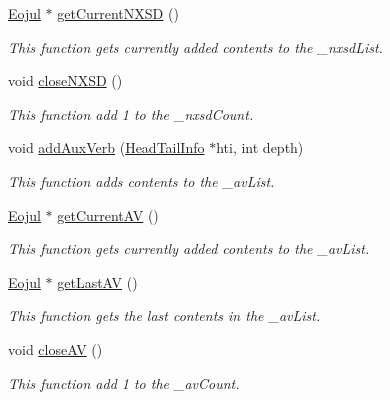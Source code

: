 \begin{CompactItemize}
\hyperlink{classkmaOrange_1_1Eojul}{Eojul} $\ast$ \hyperlink{classGuessCandidate_afe6b140e724f2bc31805c6b78f42978}{getCurrentNXSD} ()
\begin{CompactList}\small\item\em This function gets currently added contents to the \_\-nxsdList. \item\end{CompactList}\item 
void \hyperlink{classGuessCandidate_bec22d1a1868988a906fd07c7083e927}{closeNXSD} ()
\begin{CompactList}\small\item\em This function add 1 to the \_\-nxsdCount. \item\end{CompactList}\item 
void \hyperlink{classGuessCandidate_5da582496746546080413e951e3078f3}{addAuxVerb} (\hyperlink{classHeadTailInfo}{HeadTailInfo} $\ast$hti, int depth)
\begin{CompactList}\small\item\em This function adds contents to the \_\-avList. \item\end{CompactList}\item 
\hyperlink{classkmaOrange_1_1Eojul}{Eojul} $\ast$ \hyperlink{classGuessCandidate_e63d62596168193e824ffb43275ab0a5}{getCurrentAV} ()
\begin{CompactList}\small\item\em This function gets currently added contents to the \_\-avList. \item\end{CompactList}\item 
\hyperlink{classkmaOrange_1_1Eojul}{Eojul} $\ast$ \hyperlink{classGuessCandidate_f82fa6bc098f9833dc45ebd539aa53fe}{getLastAV} ()
\begin{CompactList}\small\item\em This function gets the last contents in the \_\-avList. \item\end{CompactList}\item 
void \hyperlink{classGuessCandidate_025f96e44f9a728833e5f2c102155dea}{closeAV} ()
\begin{CompactList}\small\item\em This function add 1 to the \_\-avCount. \item\end{CompactList}\end{CompactItemize}
